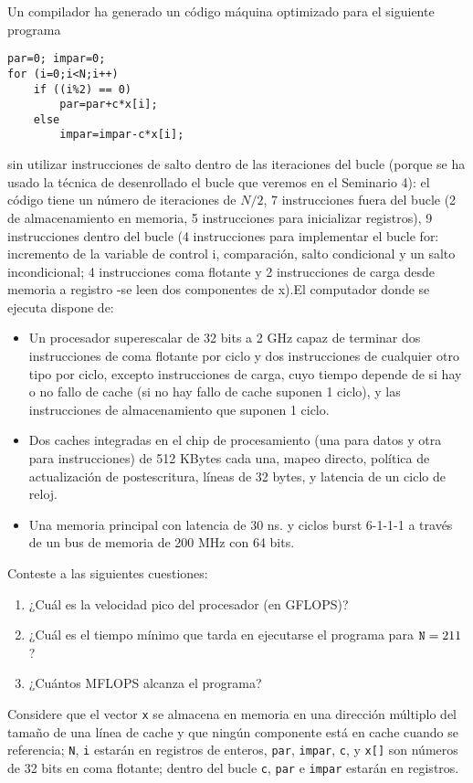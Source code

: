 \begin{ejercicio}
    Un compilador ha generado un código máquina optimizado para el siguiente programa
    \begin{verbatim}
par=0; impar=0;
for (i=0;i<N;i++)
    if ((i%2) == 0)
        par=par+c*x[i];
    else
        impar=impar-c*x[i];
    \end{verbatim}
    sin utilizar instrucciones de salto dentro de las iteraciones del bucle (porque se ha usado la técnica de
    desenrollado el bucle que veremos en el Seminario 4): el código tiene un número de iteraciones de $N/2$, 7
    instrucciones fuera del bucle (2 de almacenamiento en memoria, 5 instrucciones para inicializar registros), 9
    instrucciones dentro del bucle (4 instrucciones para implementar el bucle for: incremento de la variable de
    control i, comparación, salto condicional y un salto incondicional; 4 instrucciones coma flotante y 2
    instrucciones de carga desde memoria a registro -se leen dos componentes de x).El computador donde se
    ejecuta dispone de:
    \begin{itemize}
        \item Un procesador superescalar de 32 bits a 2 GHz capaz de terminar dos instrucciones de coma
        flotante por ciclo y dos instrucciones de cualquier otro tipo por ciclo, excepto instrucciones de carga,
        cuyo tiempo depende de si hay o no fallo de cache (si no hay fallo de cache suponen 1 ciclo), y las
        instrucciones de almacenamiento que suponen 1 ciclo.
        \item Dos caches integradas en el chip de procesamiento (una para datos y otra para instrucciones) de
        512 KBytes cada una, mapeo directo, política de actualización de postescritura, líneas de 32 bytes, y
        latencia de un ciclo de reloj.
        \item Una memoria principal con latencia de 30 ns. y ciclos burst 6-1-1-1 a través de un bus de memoria de
        200 MHz con 64 bits.
    \end{itemize}
    Conteste a las siguientes cuestiones:
    \begin{enumerate}
        \item ¿Cuál es la velocidad pico del procesador (en GFLOPS)?
        \item ¿Cuál es el tiempo mínimo que tarda en ejecutarse el programa para $\verb|N|=211$?
        \item ¿Cuántos MFLOPS alcanza el programa?
    \end{enumerate}

    \begin{observacion}
        Considere que el vector \verb|x| se almacena en memoria en una dirección múltiplo del tamaño de una
        línea de cache y que ningún componente está en cache cuando se referencia; \verb|N|, \verb|i| estarán en
        registros de enteros, \verb|par|, \verb|impar|, \verb|c|, y \verb|x[]| son números de 32 bits en coma
        flotante; dentro del bucle \verb|c|, \verb|par| e \verb|impar| estarán en registros.
    \end{observacion}
\end{ejercicio}


